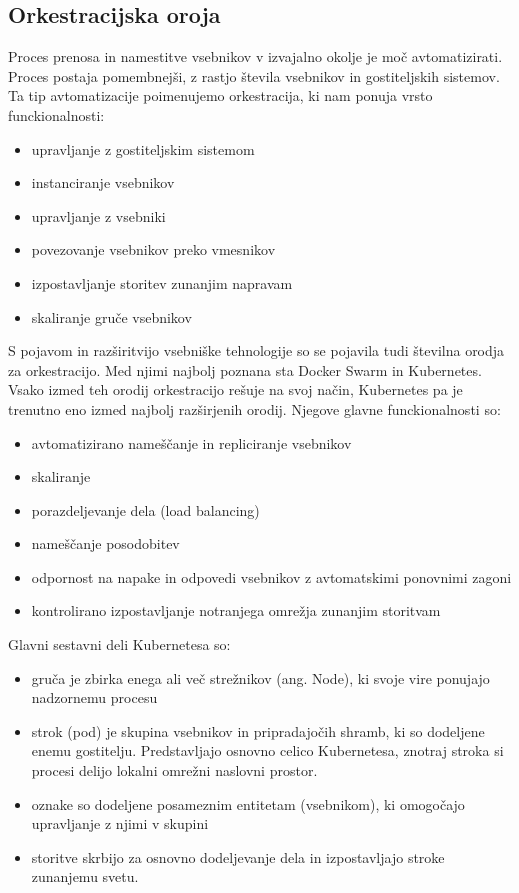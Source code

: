 \documentclass[a4paper, 12pt]{book}
\begin{document}
\subsection{Orkestracijska oroja}

Proces prenosa in namestitve vsebnikov v izvajalno okolje je moč avtomatizirati.
Proces postaja pomembnejši, z rastjo števila vsebnikov in gostiteljskih sistemov. 
Ta tip avtomatizacije poimenujemo orkestracija, ki nam ponuja vrsto funckionalnosti:
\begin{itemize}
	\item upravljanje z gostiteljskim sistemom
	\item instanciranje vsebnikov
	\item upravljanje z vsebniki
	\item povezovanje vsebnikov preko vmesnikov
	\item izpostavljanje storitev zunanjim napravam
	\item skaliranje gruče vsebnikov
\end{itemize}

S pojavom in razširitvijo vsebniške tehnologije so se pojavila tudi številna orodja za orkestracijo.
Med njimi najbolj poznana sta Docker Swarm in Kubernetes.
Vsako izmed teh orodij orkestracijo rešuje na svoj način, Kubernetes pa je trenutno eno izmed najbolj razširjenih orodij.
Njegove glavne funckionalnosti so:
\begin{itemize}
	\item avtomatizirano nameščanje in repliciranje vsebnikov
	\item skaliranje
	\item porazdeljevanje dela (load balancing)
	\item nameščanje posodobitev
	\item odpornost na napake in odpovedi vsebnikov z avtomatskimi ponovnimi zagoni
	\item kontrolirano izpostavljanje notranjega omrežja zunanjim storitvam
\end{itemize}

Glavni sestavni deli Kubernetesa so: 
\begin{itemize}
	\item gruča je zbirka enega ali več strežnikov (ang. Node), ki svoje vire ponujajo nadzornemu procesu
	\item strok (pod) je skupina vsebnikov in pripradajočih shramb, ki so dodeljene enemu gostitelju. Predstavljajo osnovno celico Kubernetesa, znotraj stroka si procesi delijo lokalni omrežni naslovni prostor.
	\item oznake so dodeljene posameznim entitetam (vsebnikom), ki omogočajo upravljanje z njimi v skupini
	\item storitve skrbijo za osnovno dodeljevanje dela in izpostavljajo stroke zunanjemu svetu.
\end{itemize}
\end{document}
